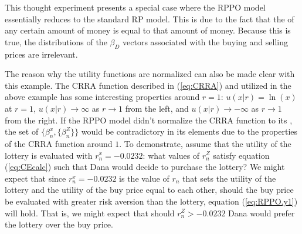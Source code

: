 This thought experiment presents a special case where the RPPO model essentially reduces to the standard RP model.
This is due to the fact that the {\CE} of any certain amount of money is equal to that amount of money.
Because this is true, the distributions of the $\beta_D$ vectors associated with the buying and selling prices are irrelevant.{\footnotemark}

\addtocounter{footnote}{-1}

The reason why the utility functions are normalized can also be made clear with this  example.
The CRRA function described in (\ref{eq:CRRA}) and utilized in the above example has some interesting properties around $r=1$: $u(x|r) = \ln(x)$ at $r=1$, $u(x|r) \to \infty$ as $r \to 1$ from the left, and $u(x|r) \to -\infty$ as $r \to 1$ from the right.{\footnotemark}
If the RPPO model didn't normalize the CRRA function to its {\CE}, the set of $\{\beta_n^x,\{\beta_n^Z\}\}$  would be contradictory in its elements due to the properties of the CRRA function around $1$.
To demonstrate, assume that the utility of the lottery is evaluated with $r_n^x = -0.0232$: what values of $r_n^Z$ satisfy equation (\ref{eq:CEcalc}) such that Dana would decide to purchase the lottery? We might expect that since $r_n^x = -0.0232$ is the value of $r_n$ that sets the utility of the lottery and the utility of the buy price equal to each other,  should the buy price be evaluated with greater risk aversion than the lottery, equation (\ref{eq:RPPO.y1}) will hold.
That is, we might expect that should $r_n^Z > -0.0232$ Dana would prefer the lottery over the buy price.

\addtocounter{footnote}{-1}

